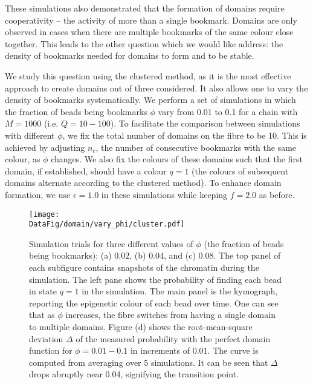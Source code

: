\documentclass[12pt]{article}
\newcommand*{\DataFig}{/Users/MichaelChiang/Desktop/epigenetics_data/}
\begin{document}
These simulations also demonstrated that the formation of domains require cooperativity -- the activity of more than a single bookmark. Domains are only observed in cases when there are multiple bookmarks of the same colour close together. This leads to the other question which we would like address: the density of bookmarks needed for domains to form and to be stable. 

We study this question using the clustered method, as it is the most effective approach to create domains out of three considered. It also allows one to vary the density of bookmarks systematically. We perform a set of simulations in which the fraction of beads being bookmarks $\phi$ vary from 0.01 to 0.1 for a chain with $M = 1000$ (i.e. $Q = 10 - 100$). To facilitate the comparison between simulations with different $\phi$, we fix the total number of domains on the fibre to be 10. This is achieved by adjusting $n_c$, the number of consecutive bookmarks with the same colour, as $\phi$ changes. We also fix the colours of these domains such that the first domain, if established, should have a colour $q = 1$ (the colours of subsequent domains alternate according to the clustered method). To enhance domain formation, we use $\epsilon = 1.0$ in these simulations while keeping $f = 2.0$ as before.

\begin{figure}[h]
\centering
\centerline{\texttt{[image: \\DataFig/domain/vary\_phi/cluster.pdf]}}
\caption{Simulation trials for three different values of $\phi$ (the fraction of beads being bookmarks): (a) $0.02$, (b) $0.04$, and (c) $0.08$. The top panel of each subfigure contains snapshots of the chromatin during the simulation. The left pane shows the probability of finding each bead in state $q = 1$ in the simulation. The main panel is the kymograph, reporting the epigenetic colour of each bead over time. One can see that as $\phi$ increases, the fibre switches from having a single domain to multiple domains. Figure (d) shows the root-mean-square deviation $\Delta$ of the measured probability with the perfect domain function for $\phi = 0.01 - 0.1$ in increments of $0.01$. The curve is computed from averaging over 5 simulations. It can be seen that $\Delta$ drops abruptly near 0.04, signifying the transition point.}
\label{fig:cluster}
\end{figure}
\end{document}
